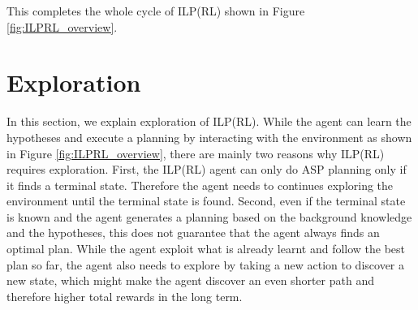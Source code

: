 This completes the whole cycle of ILP(RL) shown in Figure \ref{fig:ILPRL_overview}.

\section{Exploration}
\label{exploration}
In this section, we explain exploration of ILP(RL). While the agent can learn the hypotheses and execute a planning by interacting with the environment as shown in Figure \ref{fig:ILPRL_overview},
there are mainly two reasons why ILP(RL) requires exploration. 
First, the ILP(RL) agent can only do ASP planning only if it finds a terminal state. 
Therefore the agent needs to continues exploring the environment until the terminal state is found. 
Second, even if the terminal state is known and the agent generates a planning based on the background knowledge and the hypotheses, 
this does not guarantee that the agent always finds an optimal plan.
While the agent exploit what is already learnt and follow the best plan so far,
the agent also needs to explore by taking a new action to discover a new state, which might make the agent discover an even shorter path and therefore higher total rewards in the long term.

